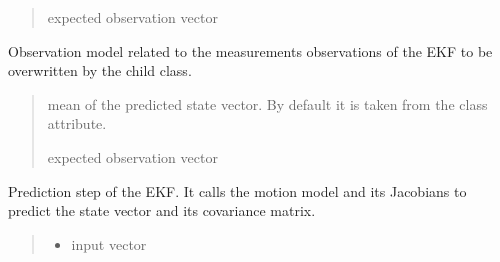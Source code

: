 \documentclass[letterpaper,10pt,english]{sphinxmanual}
\begin{document}
\begin{fulllineitems}
\begin{fulllineitems}
\begin{quote}
\begin{description}
\sphinxAtStartPar
expected observation vector

\end{description}\end{quote}

\end{fulllineitems}


\begin{fulllineitems}
\label{\detokenize{EKF:EKF.EKF.hm}}
\pysigstartsignatures
{}
\pysigstopsignatures
\sphinxAtStartPar
Observation model related to the measurements observations of the EKF to be overwritten by the child class.
\begin{quote}\begin{description}
\sphinxAtStartPar
{} \textendash{} mean of the predicted state vector. By default it is taken from the class attribute.

\sphinxAtStartPar
expected observation vector

\end{description}\end{quote}

\end{fulllineitems}


\begin{fulllineitems}
\label{\detokenize{EKF:EKF.EKF.Prediction}}
\pysigstartsignatures
{}
\pysigstopsignatures
\sphinxAtStartPar
Prediction step of the EKF. It calls the motion model and its Jacobians to predict the state vector and its covariance matrix.
\begin{quote}\begin{description}
\begin{itemize}
\item {} 
\sphinxAtStartPar
{} \textendash{} input vector


\end{itemize}
\end{description}
\end{quote}
\end{fulllineitems}
\end{fulllineitems}
\end{document}
